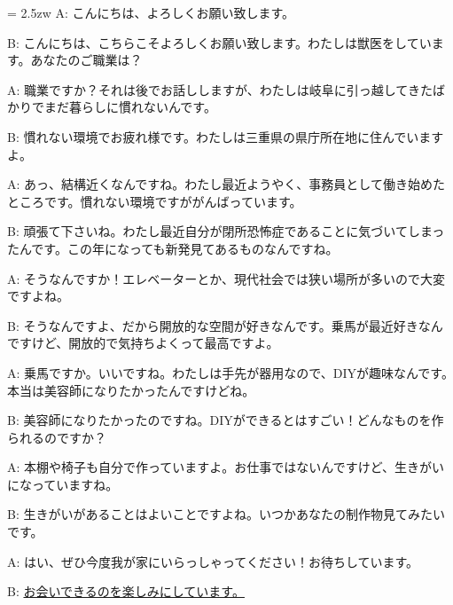 \documentclass[11pt]{amsart}
\title{}
\author{}
\newenvironment{hangall}[1]{\hangindent = 2.5zw\everypar{\hangindent = 2.5zw}}{}
\begin{document}
\maketitle
\begin{hangall}{}%
A: こんにちは、よろしくお願い致します。

B: こんにちは、こちらこそよろしくお願い致します。わたしは獣医をしています。あなたのご職業は？

A: 職業ですか？それは後でお話ししますが、わたしは岐阜に引っ越してきたばかりでまだ暮らしに慣れないんです。

B: 慣れない環境でお疲れ様です。わたしは三重県の県庁所在地に住んでいますよ。

A: あっ、結構近くなんですね。わたし最近ようやく、事務員として働き始めたところです。慣れない環境ですががんばっています。

B: 頑張て下さいね。わたし最近自分が閉所恐怖症であることに気づいてしまったんです。この年になっても新発見てあるものなんですね。

A: そうなんですか！エレベーターとか、現代社会では狭い場所が多いので大変ですよね。

B: そうなんですよ、だから開放的な空間が好きなんです。乗馬が最近好きなんですけど、開放的で気持ちよくって最高ですよ。

A: 乗馬ですか。いいですね。わたしは手先が器用なので、DIYが趣味なんです。本当は美容師になりたかったんですけどね。

B: 美容師になりたかったのですね。DIYができるとはすごい！どんなものを作られるのですか？

A: 本棚や椅子も自分で作っていますよ。お仕事ではないんですけど、生きがいになっていますね。

B: 生きがいがあることはよいことですよね。いつかあなたの制作物見てみたいです。

A: はい、ぜひ今度我が家にいらっしゃってください！お待ちしています。

B: \ul{お会いできるのを楽しみにしています。}\end{hangall}
\end{document}
